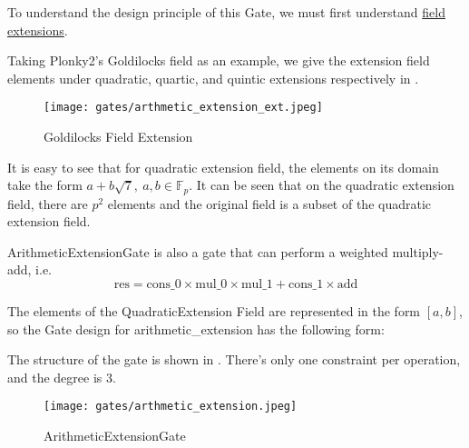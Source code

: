 
\hspace*{\fill}

\indent To understand the design principle of this Gate, we must first understand \href{https://en.wikipedia.org/wiki/Field_extension#Extension_field}{field extensions}. 

Taking Plonky2's Goldilocks field as an example, we give the extension field elements under quadratic, quartic, and quintic extensions respectively in .

\begin{figure}[!ht]
    \centering
    \texttt{[image: gates/arthmetic\_extension\_ext.jpeg]}
    \caption{Goldilocks Field Extension}
    \label{fig:goldilocks field extension}
\end{figure}

It is easy to see that for quadratic extension field, the elements on its domain take the form $a+b\sqrt{7}, \ a,b \in \mathbb{F}_p$.
It can be seen that on the quadratic extension field, there are $p^2$ elements and the original field is a subset of the quadratic extension field.

ArithmeticExtensionGate is also a gate that can perform a weighted multiply-add, i.e.
\[ \text{res} = \text{cons\_0} \times \text{mul\_0} \times \text{mul\_1} + \text{cons\_1} \times \text{add} \]

The elements of the QuadraticExtension Field are represented in the form $[a, b]$, so the Gate design for arithmetic\_extension has the following form:

The structure of the gate is shown in . There's only one constraint per operation, and the degree is 3.
\begin{figure}[!ht]
    \centering
    \texttt{[image: gates/arthmetic\_extension.jpeg]}
    \caption{ArithmeticExtensionGate}
    \label{fig:arthmetic-extension}
\end{figure}
